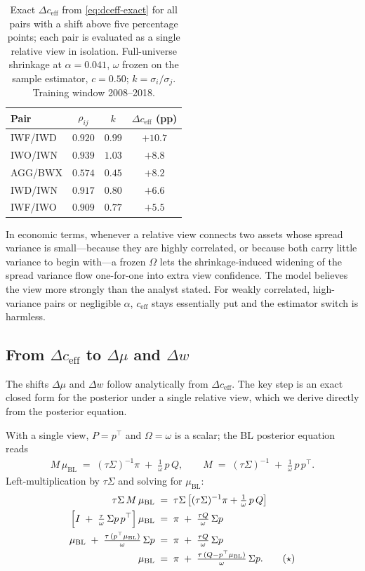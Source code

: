 \documentclass[a4paper,11pt]{article}
\theoremstyle{plain}
\theoremstyle{definition}
\newcommand{\muBL}{\mu_{\mathrm{BL}}}
\newcommand{\eff}{\mathrm{eff}}
\begin{document}
\begin{table}[H]
\centering
\caption{Exact $\Delta c_{\eff}$ from \eqref{eq:dceff-exact} for all
pairs with a shift above five percentage points; each pair is evaluated
as a single relative view in isolation. Full-universe shrinkage at
$\alpha = 0.041$, $\omega$ frozen on the sample estimator,
$c = 0.50$; $k = \sigma_i/\sigma_j$. Training window 2008--2018.}
\label{tab:pairs}
\begin{tabular}{lccc}
\toprule
Pair & $\rho_{ij}$ & $k$ & $\Delta c_{\eff}$ (pp) \\
\midrule
IWF/IWD & $0.920$ & $0.99$ & $+10.7$ \\
IWO/IWN & $0.939$ & $1.03$ & $+8.8$ \\
AGG/BWX & $0.574$ & $0.45$ & $+8.2$ \\
IWD/IWN & $0.917$ & $0.80$ & $+6.6$ \\
IWF/IWO & $0.909$ & $0.77$ & $+5.5$ \\
\bottomrule
\end{tabular}
\end{table}

In economic terms, whenever a relative view connects two
assets whose spread variance is small---because they are highly
correlated, or because both carry little variance to begin with---a
frozen $\Omega$ lets the shrinkage-induced widening of the spread
variance flow one-for-one into extra view confidence. The model believes
the view more strongly than the analyst stated. For weakly correlated,
high-variance pairs or negligible $\alpha$, $c_{\eff}$ stays essentially
put and the estimator switch is harmless.

\subsection{From $\Delta c_{\eff}$ to $\Delta\mu$ and $\Delta w$}
\label{sec:dmu-dw}

The shifts $\Delta\mu$ and $\Delta w$ follow analytically from
$\Delta c_{\eff}$. The key step is an exact closed form for the
posterior under a single relative view, which we derive directly from
the posterior equation.

With a single view, $P = p^\top$ and $\Omega = \omega$ is a scalar; the
BL posterior equation reads
\begin{align*}
  M\,\muBL \;=\; (\tau\Sigma)^{-1}\pi \;+\; \tfrac{1}{\omega}\,p\,Q,
  \qquad M \;=\; (\tau\Sigma)^{-1} \;+\; \tfrac{1}{\omega}\,p\,p^\top.
\end{align*}
Left-multiplication by $\tau\Sigma$ and solving for $\muBL$:
\begin{align*}
  \tau\Sigma\,M\,\muBL \;&=\; \tau\Sigma\,\bigl[(\tau\Sigma)^{-1}\pi + \tfrac{1}{\omega}\,p\,Q\bigr]\\
  \Bigl[I \;+\; \tfrac{\tau}{\omega}\,\Sigma p\,p^\top\Bigr]\,\muBL \;&=\; \pi \;+\; \tfrac{\tau Q}{\omega}\,\Sigma p\\
  \muBL \;+\; \tfrac{\tau\,(p^\top\muBL)}{\omega}\,\Sigma p \;&=\; \pi \;+\; \tfrac{\tau Q}{\omega}\,\Sigma p\\
  \muBL \;&=\; \pi \;+\; \tfrac{\tau\,(Q - p^\top\muBL)}{\omega}\,\Sigma p.
  \tag{$\star$}
\end{align*}
\end{document}
